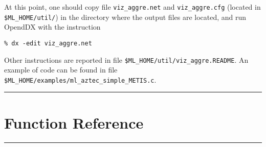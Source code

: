 \documentclass[10pt,letter,relax]{SANDreport}
\newcommand{\HRule}{\noindent\rule{\linewidth}{1mm}}
\begin{document}
At this point, one should copy file \verb!viz_aggre.net! and
\verb!viz_aggre.cfg! (located in \verb!$ML_HOME/util/!) in the directory
where the output files are located, and run OpendDX with the instruction
\begin{verbatim}
% dx -edit viz_aggre.net
\end{verbatim}
Other instructions are reported in file
\verb!$ML_HOME/util/viz_aggre.README!. An example of code can be found in
file \verb!$ML_HOME/examples/ml_aztec_simple_METIS.c!.


\clearpage
\newpage

\vspace*{3cm}
\HRule
\part{Function Reference}
\HRule
\clearpage
\newpage




\end{document}
